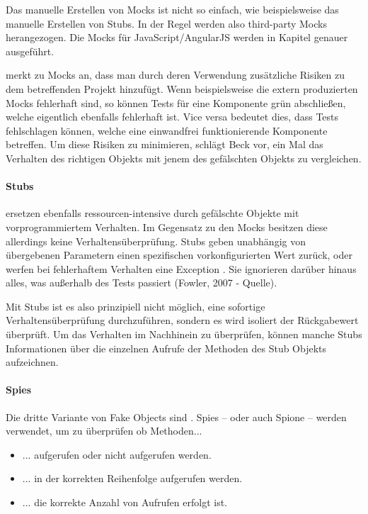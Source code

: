 {Das manuelle Erstellen von Mocks ist nicht so einfach, wie beispielsweise das manuelle Erstellen von Stubs. In der Regel werden also third-party Mocks herangezogen. Die Mocks für JavaScript/AngularJS werden in Kapitel  genauer ausgeführt.

\cite[145]{Beck:2003} merkt zu Mocks an, dass man durch deren Verwendung zusätzliche Risiken zu dem betreffenden Projekt hinzufügt. Wenn beispielsweise die extern produzierten Mocks fehlerhaft sind, so können Tests für eine Komponente grün abschließen, welche eigentlich ebenfalls fehlerhaft ist. Vice versa bedeutet dies, dass Tests fehlschlagen können, welche eine einwandfrei funktionierende Komponente betreffen.
Um diese Risiken zu minimieren, schlägt Beck vor, ein Mal das Verhalten des richtigen Objekts mit jenem des gefälschten Objekts zu vergleichen.

\paragraph{Stubs}
 ersetzen ebenfalls ressourcen-intensive durch gefälschte Objekte mit vorprogrammiertem Verhalten. Im Gegensatz zu den Mocks besitzen diese allerdings keine Verhaltensüberprüfung. Stubs geben unabhängig von übergebenen Parametern einen spezifischen vorkonfigurierten Wert zurück, oder werfen bei fehlerhaftem Verhalten eine Exception \autocite[443]{Johansen:2011}. Sie ignorieren darüber hinaus alles, was außerhalb des Tests passiert (Fowler, 2007 - Quelle).

Mit Stubs ist es also prinzipiell nicht möglich, eine sofortige Verhaltensüberprüfung durchzuführen, sondern es wird isoliert der Rückgabewert überprüft. Um das Verhalten im Nachhinein zu überprüfen, können manche Stubs Informationen über die einzelnen Aufrufe der Methoden des Stub Objekts aufzeichnen.

\paragraph{Spies}
Die dritte Variante von Fake Objects sind . Spies -- oder auch Spione -- werden verwendet, um zu überprüfen ob Methoden...
\begin{itemize}
  \item ... aufgerufen oder nicht aufgerufen werden.
  \item ... in der korrekten Reihenfolge aufgerufen werden.
  \item ... die korrekte Anzahl von Aufrufen erfolgt ist.
\end{itemize}

}

